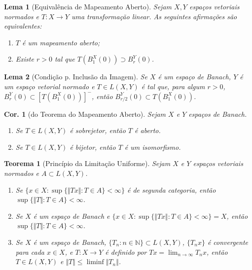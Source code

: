 \documentclass[11pt]{article}
\theoremstyle{yellowhead}
\newtheorem*{theorem}{Teorema}
\newtheorem*{lemma}{Lema}
\newtheorem*{corollary}{Cor.}
\theoremstyle{yellowdef}
\begin{document}
\begin{multicols}{3}
\begin{lemma}[Equivalência de Mapeamento Aberto]
Sejam $X, Y$ espaços vetoriais normados e $T: X \to Y$ uma transformação linear. As seguintes afirmações são equivalentes:
\begin{enumerate}[label=(\alph*)]
    \item $T$ é um mapeamento aberto;
    \item Existe $r > 0$ tal que $T(B_1^X(0)) \supset B_r^Y(0)$.
\end{enumerate}
\end{lemma}

\begin{lemma}[Condição p. Inclusão da Imagem]
Se $X$ é um espaço de Banach, $Y$ é um espaço vetorial normado e $T \in L(X, Y)$ é tal que, para algum $r > 0$, $B_r^Y(0) \subset [T(B_1^X(0))]^-$, então $B_{r/2}^Y(0) \subset T(B_1^X(0))$.
\end{lemma}

\begin{corollary}[do Teorema do Mapeamento Aberto]
Sejam $X$ e $Y$ espaços de Banach.
\begin{enumerate}[label=(\alph*)]
    \item Se $T \in L(X, Y)$ é sobrejetor, então $T$ é aberto.
    \item Se $T \in L(X, Y)$ é bijetor, então $T$ é um isomorfismo.
\end{enumerate}
\end{corollary}

\begin{theorem}[Princípio da Limitação Uniforme]
Sejam $X$ e $Y$ espaços vetoriais normados e $A \subset L(X, Y)$.
\begin{enumerate}[label=(\alph*)]
    \item Se $\{x \in X: \sup\{\Vert Tx \Vert : T \in A\} < \infty\}$ é de segunda categoria, então $\sup\{\Vert T \Vert : T \in A\} < \infty$.
    \item Se $X$ é um espaço de Banach e $\{x \in X: \sup\{\Vert Tx \Vert : T \in A\} < \infty\} = X$, então $\sup\{\Vert T \Vert : T \in A\} < \infty$.
    \item Se $X$ é um espaço de Banach, $\{T_n : n \in \mathbb{N}\} \subset L(X, Y)$, $\{T_nx\}$ é convergente para cada $x \in X$, e $T: X \to Y$ é definido por $Tx = \lim_{n \to \infty} T_nx$, então $T \in L(X, Y)$ e $\Vert T \Vert \le \liminf \Vert T_n \Vert$.
\end{enumerate}
\end{theorem}


\end{multicols}
\end{document}
